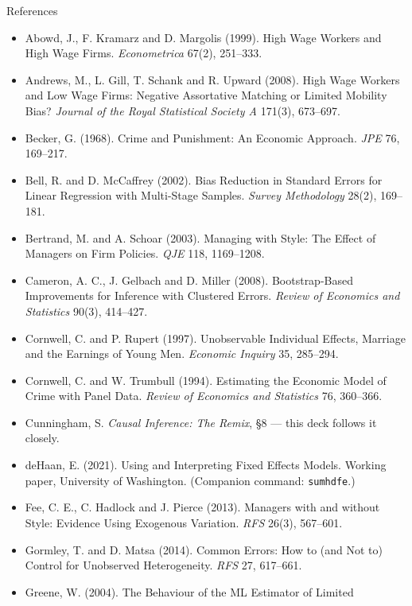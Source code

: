\documentclass[
  11pt,
  ignorenonframetext,
  aspectratio=169,
]{beamer}
\providecommand{\tightlist}{%
  \setlength{\itemsep}{0pt}\setlength{\parskip}{0pt}}
\begin{document}
\begin{frame}[fragile]{References}
\protect{}\label{references}
\tiny

\begin{itemize}
\tightlist
\item
  Abowd, J., F. Kramarz and D. Margolis (1999). High Wage Workers and
  High Wage Firms. \emph{Econometrica} 67(2), 251--333.
\item
  Andrews, M., L. Gill, T. Schank and R. Upward (2008). High Wage
  Workers and Low Wage Firms: Negative Assortative Matching or Limited
  Mobility Bias? \emph{Journal of the Royal Statistical Society A}
  171(3), 673--697.
\item
  Becker, G. (1968). Crime and Punishment: An Economic Approach.
  \emph{JPE} 76, 169--217.
\item
  Bell, R. and D. McCaffrey (2002). Bias Reduction in Standard Errors
  for Linear Regression with Multi-Stage Samples. \emph{Survey
  Methodology} 28(2), 169--181.
\item
  Bertrand, M. and A. Schoar (2003). Managing with Style: The Effect of
  Managers on Firm Policies. \emph{QJE} 118, 1169--1208.
\item
  Cameron, A. C., J. Gelbach and D. Miller (2008). Bootstrap-Based
  Improvements for Inference with Clustered Errors. \emph{Review of
  Economics and Statistics} 90(3), 414--427.
\item
  Cornwell, C. and P. Rupert (1997). Unobservable Individual Effects,
  Marriage and the Earnings of Young Men. \emph{Economic Inquiry} 35,
  285--294.
\item
  Cornwell, C. and W. Trumbull (1994). Estimating the Economic Model of
  Crime with Panel Data. \emph{Review of Economics and Statistics} 76,
  360--366.
\item
  Cunningham, S. \emph{Causal Inference: The Remix}, §8 --- this deck
  follows it closely.
\item
  deHaan, E. (2021). Using and Interpreting Fixed Effects Models.
  Working paper, University of Washington. (Companion command:
  \texttt{sumhdfe}.)
\item
  Fee, C. E., C. Hadlock and J. Pierce (2013). Managers with and without
  Style: Evidence Using Exogenous Variation. \emph{RFS} 26(3), 567--601.
\item
  Gormley, T. and D. Matsa (2014). Common Errors: How to (and Not to)
  Control for Unobserved Heterogeneity. \emph{RFS} 27, 617--661.
\item
  Greene, W. (2004). The Behaviour of the ML Estimator of Limited

\end{itemize}
\end{frame}
\end{document}
